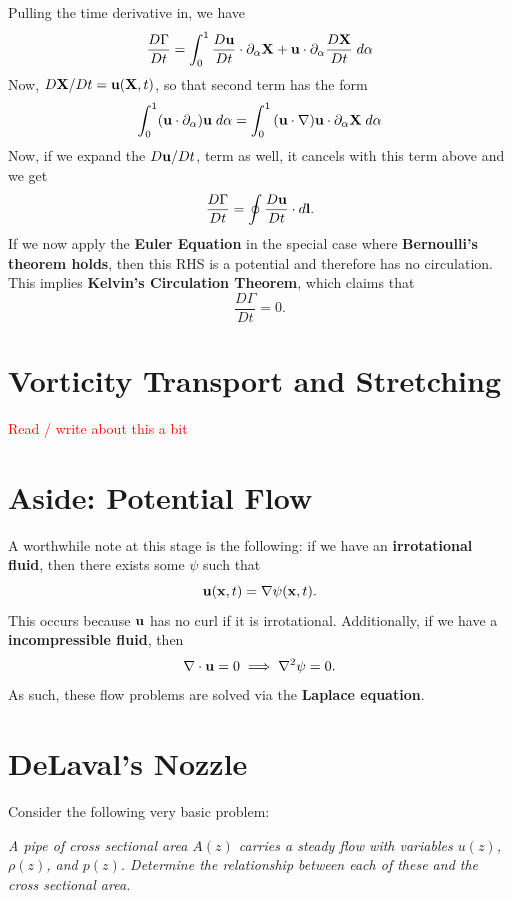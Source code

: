 Pulling the time derivative in, we have
\[
\frac{D\Gamma}{Dt} = \int_0^1 \frac{D{\bf u}}{Dt} \cdot \partial_\alpha {\bf X} + {\bf u} \cdot \partial_\alpha\frac{D{\bf X}}{Dt} \; d\alpha
\]
Now, $D{\bf X}/Dt = {\bf u}({\bf X},t)$, so that second term has the form
\[
\int_0^1 ({\bf u} \cdot \partial_\alpha){\bf u} \;d\alpha = \int_0^1 {\bf (u \cdot \nabla){\bf u} \cdot \partial_\alpha {\bf X}}\; d\alpha
\]
Now, if we expand the $D{\bf u}/Dt$, term as well, it cancels with this term above and we get
\[
\frac{D\Gamma}{Dt} = \oint \frac{D{\bf u}}{Dt} \cdot d{\bf l}.
\]
If we now apply the \textbf{Euler Equation} in the special case where \textbf{Bernoulli's theorem holds}, then this RHS is a potential and therefore has no circulation. This implies \textbf{Kelvin's Circulation Theorem}, which claims that 
\[
\frac{D\Gamma}{Dt} = 0.
\]

\section{Vorticity Transport and Stretching}

\textcolor{red}{Read / write about this a bit}

\section{Aside: Potential Flow}

A worthwhile note at this stage is the following: if we have an \textbf{irrotational fluid}, then there exists some $\psi$ such that
\[
{\bf u}({\bf x},t) = \nabla \psi({\bf x},t).
\]
This occurs because ${\bf u}$ has no curl if it is irrotational. Additionally, if we have a \textbf{incompressible fluid}, then
\[
\nabla \cdot {\bf u} = 0 \implies \nabla^2 \psi = 0.
\]
As such, these flow problems are solved via the \textbf{Laplace equation}.

\section{DeLaval's Nozzle}

Consider the following very basic problem:
\begin{center}
\textit{A pipe of cross sectional area $A(z)$ carries a steady flow with variables $u(z)$, $\rho(z)$, and $p(z)$. Determine the relationship between each of these and the cross sectional area.}
\end{center}

